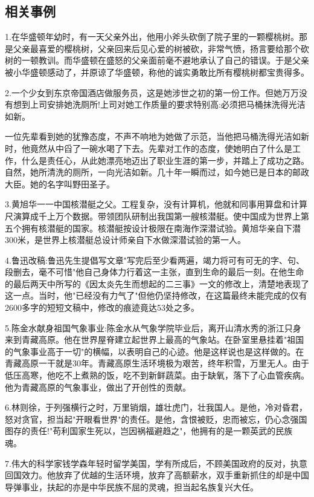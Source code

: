 \documentclass[UTF8]{ctexart}
\begin{document}
\subsection{相关事例}
1.在华盛顿年幼时，有一天父亲外出，他用小斧头砍倒了院子里的一颗樱桃树。那是父亲最喜爱的樱桃树，父亲回来后见心爱的树被砍，非常气愤，扬言要给那个砍树的一顿教训。而华盛顿在盛怒的父亲面前毫不避地承认了自己的错误。于是父亲被小华盛顿感动了，并原谅了华盛顿，称他的诚实勇敢比所有樱桃树都宝贵得多。\par
2.一个少女到东京帝国酒店做服务员，这是她涉世之初的第一份工作。但她万万没有想到上司安排她洗厕所!上司对她工作质量的要求特别高:必须把马桶抹洗得光洁如新。\par
一位先辈看到她的犹豫态度，不声不响地为她做了示范，当他把马桶洗得光洁如新时，他竟然从中舀了一碗水喝了下去。先辈对工作的态度，使她明白了什么是工作，什么是责任心，从此她漂亮地迈出了职业生涯的第一步，并踏上了成功之路。自然，她所清洗的厕所，一向光洁如新。几十年一瞬而过，如今她已是日本的邮政大臣。她的名字叫野田圣子。\par
3.黄旭华⼀⼀中国核潜艇之父。⼯程复杂，没有计算机，他就和同事⽤算盘和计算尺演算成千上万个数据。带领团队研制出我国第⼀艘核潜艇。使中国成为世界上第五个拥有核潜艇的国家。核潜艇按设计极限在南海作深潜试验。黄旭华亲⾃下潜300⽶，是世界上核潜艇总设计师亲⾃下水做深潜试验的第⼀人。\par
4.鲁迅改稿:鲁迅先生提倡写文章"写完后至少看两遍，竭力将可有可无的字、句、段删去，毫不可惜"他自己身体力行着这一主张，直到生命的最后一刻。在他生命的最后两天中所写的《因太炎先生而想起的二三事》一文的修改上，清楚地表现了这一点。当时，他"已经没有力气了"但他仍坚持修改，在这篇最终未能完成的仅有2600多字的短短文稿中，修改的痕迹竟达53处之多。\par
5.陈金水献身祖国气象事业:陈金水从气象学院毕业后，离开山清水秀的浙江只身来到青藏高原。他在世界屋脊建立起世界上最高的气象站。在卧室里悬挂着"祖国的气象事业高于一切"的横幅，以表明自己的心迹。他是这样说也是这样做的。在青藏高原一干就是30年。青藏高原生活环境极为艰苦，终年积雪，万里无人。由于低压高寒，他吃不上煮熟的饭，吃不到新鲜蔬菜。由于缺氧，落下了心血管疾病。他为青藏高原的气象事业，做出了开创性的贡献。\par
6.林则徐，于列强横行之时，万里销烟，雄壮虎门，壮我国人。是他，冷对昏君，怒对贪官，担当起"开眼看世界"的责任。是他，含恨被贬，忠而被忘，仍心念强国图存的责任!"苟利国家生死以，岂因祸福避趋之"，他拥有的是一颗英武的民族魂。\par
7.伟大的科学家钱学森年轻时留学美国，学有所成后，不顾美国政府的反对，执意回国效力。他放弃了优越的生活环境，放弃了高额薪水，双手重新抓住的却是中国导弹事业，扶起的亦是中华民族不屈的灵魂，担当起名族复兴大任。\par
\end{document}
